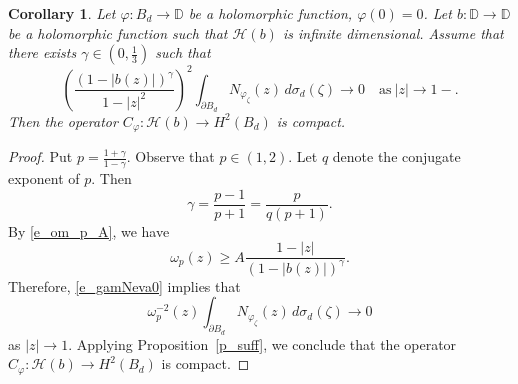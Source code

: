 \documentclass[10pt,a4paper]{amsart}
\newtheorem{corollary}{Corollary}
\newcommand{\Dbb}{\mathbb D}
\newcommand{\bd}{{B_d}}
\newcommand{\cph}{C_\varphi}
\newcommand{\dbr}{\mathcal{H}}
\newcommand{\meal}{\sigma_d}
\newcommand{\om}{\omega}
\newcommand{\ph}{\varphi}
\newcommand{\spd}{\partial B_d}
\newcommand{\za}{\zeta}
\begin{document}
\begin{corollary}\label{c_suff}
Let $\ph: \bd \to \Dbb$ be a holomorphic function, $\ph(0)=0$.
Let $b:\Dbb \to \Dbb$ be a holomorphic function such that $\dbr(b)$ is infinite dimensional.
Assume that there exists $\gamma\in (0, \frac{1}{3})$ such that
\begin{equation}\label{e_gamNeva0}
\left(\frac{(1-|b(z)|)^\gamma}{1-|z|^2} \right)^2 \int_{\spd} N_{\ph_\za} (z)\, d\meal(\za) 
\to 0\quad \textrm{as}\ |z|\to 1-.
\end{equation}
Then the operator $\cph: \dbr(b) \to H^2(\bd)$ is compact.
\end{corollary}

\begin{proof}
Put $p = \frac{1+\gamma}{1-\gamma}$. Observe that $p\in (1,2)$.
Let $q$ denote the conjugate exponent of $p$.
Then
\[
\gamma = \frac{p-1}{p+1} = \frac{p}{q(p+1)}.
\]
By \eqref{e_om_p_A}, we have
\[
\om_p (z) \ge A\frac{1-|z|}{(1-|b(z)|)^\gamma}.
\]
Therefore, \eqref{e_gamNeva0} implies that
\[
\om_p^{-2}(z) \int_{\spd} N_{\ph_\za}(z)\, d\meal(\za) \to 0
\]
as $|z|\to 1$. Applying Proposition~\ref{p_suff}, we conclude that the operator
$\cph: \dbr(b) \to H^2(\bd)$ is compact.
\end{proof}
\end{document}
